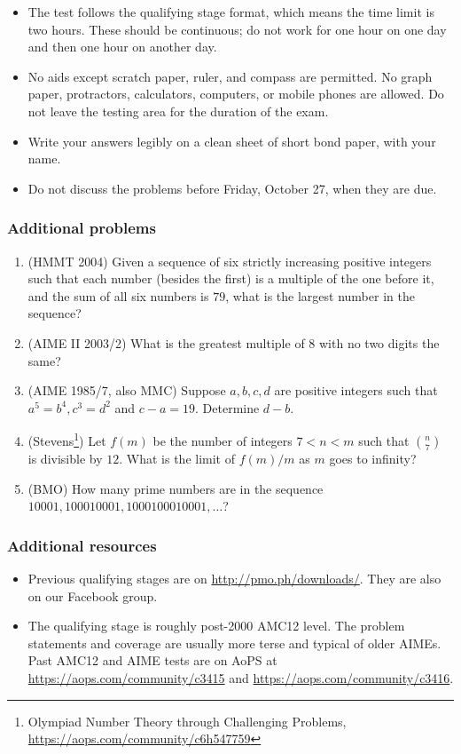 \documentclass[10pt,paper=letter]{scrartcl}
\begin{document}
\begin{itemize}
  \item The test follows the qualifying stage format, which means the time limit is two hours. These should be continuous; do not work for one hour on one day and then one hour on another day.
  \item No aids except scratch paper, ruler, and compass are permitted. No graph paper, protractors, calculators, computers, or mobile phones are allowed. Do not leave the testing area for the duration of the exam.
  \item Write your answers legibly on a clean sheet of short bond paper, with your name.
  \item Do not discuss the problems before Friday, October 27, when they are due.
\end{itemize}

\subsubsection*{Additional problems}

\begin{enumerate}
  \item (HMMT 2004) Given a sequence of six strictly increasing positive integers such that each number (besides the first) is a multiple of the one before it, and the sum of all six numbers is $79$, what is the largest number in the sequence?
  \item (AIME II 2003/2) What is the greatest multiple of $8$ with no two digits the same?
  \item (AIME 1985/7, also MMC) Suppose $a, b, c, d$ are positive integers such that $a^5 = b^4, c^3 = d^2$ and $c-a = 19$. Determine $d-b$.
  \item (Stevens\footnote{Olympiad Number Theory through Challenging Problems, \url{https://aops.com/community/c6h547759}}) Let $f(m)$ be the number of integers $7 < n < m$ such that $\binom{n}{7}$ is divisible by $12$. What is the limit of $f(m)/m$ as $m$ goes to infinity?
  \item (BMO) How many prime numbers are in the sequence $10001, 100010001, 1000100010001, \ldots$?
\end{enumerate}

\subsubsection*{Additional resources}

\begin{itemize}
  \item Previous qualifying stages are on \url{http://pmo.ph/downloads/}. They are also on our Facebook group.
  \item The qualifying stage is roughly post-2000 AMC12 level. The problem statements and coverage are usually more terse and typical of older AIMEs. Past AMC12 and AIME tests are on AoPS at \url{https://aops.com/community/c3415} and \url{https://aops.com/community/c3416}.
\end{itemize}
\end{document}

